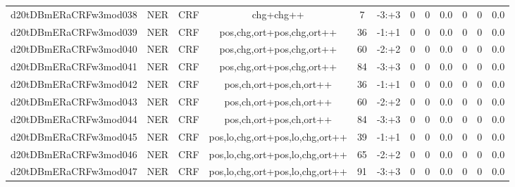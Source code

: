 \documentclass[a4paper]{article}
\begin{document}
\begin{landscape}
\begin{center}
\begin{tabular}{ |c|c|c|c|c|c|c|c|c|c|c|c|}
 
 	
 	\small{ d20tDBmERaCRFw3mod038 } & \small{ NER} & \small{  CRF }  & chg+chg++  &  7 &  \small{  -3:+3 }  &  0 & 0 & 0.0  &  0 & 0 & 0.0 \\
 	

 
 	
 	\small{ d20tDBmERaCRFw3mod039 } & \small{ NER} & \small{  CRF }  & pos,chg,ort+pos,chg,ort++  &  36 &  \small{  -1:+1 }  &  0 & 0 & 0.0  &  0 & 0 & 0.0 \\
 	

 
 	
 	\small{ d20tDBmERaCRFw3mod040 } & \small{ NER} & \small{  CRF }  & pos,chg,ort+pos,chg,ort++  &  60 &  \small{  -2:+2 }  &  0 & 0 & 0.0  &  0 & 0 & 0.0 \\
 	

 
 	
 	\small{ d20tDBmERaCRFw3mod041 } & \small{ NER} & \small{  CRF }  & pos,chg,ort+pos,chg,ort++  &  84 &  \small{  -3:+3 }  &  0 & 0 & 0.0  &  0 & 0 & 0.0 \\
 	

 
 	
 	\small{ d20tDBmERaCRFw3mod042 } & \small{ NER} & \small{  CRF }  & pos,ch,ort+pos,ch,ort++  &  36 &  \small{  -1:+1 }  &  0 & 0 & 0.0  &  0 & 0 & 0.0 \\
 	

 
 	
 	\small{ d20tDBmERaCRFw3mod043 } & \small{ NER} & \small{  CRF }  & pos,ch,ort+pos,ch,ort++  &  60 &  \small{  -2:+2 }  &  0 & 0 & 0.0  &  0 & 0 & 0.0 \\
 	

 
 	
 	\small{ d20tDBmERaCRFw3mod044 } & \small{ NER} & \small{  CRF }  & pos,ch,ort+pos,ch,ort++  &  84 &  \small{  -3:+3 }  &  0 & 0 & 0.0  &  0 & 0 & 0.0 \\
 	

 
 	
 	\small{ d20tDBmERaCRFw3mod045 } & \small{ NER} & \small{  CRF }  & pos,lo,chg,ort+pos,lo,chg,ort++  &  39 &  \small{  -1:+1 }  &  0 & 0 & 0.0  &  0 & 0 & 0.0 \\
 	

 
 	
 	\small{ d20tDBmERaCRFw3mod046 } & \small{ NER} & \small{  CRF }  & pos,lo,chg,ort+pos,lo,chg,ort++  &  65 &  \small{  -2:+2 }  &  0 & 0 & 0.0  &  0 & 0 & 0.0 \\
 	

 
 	
 	\small{ d20tDBmERaCRFw3mod047 } & \small{ NER} & \small{  CRF }  & pos,lo,chg,ort+pos,lo,chg,ort++  &  91 &  \small{  -3:+3 }  &  0 & 0 & 0.0  &  0 & 0 & 0.0 \\
 	


\end{tabular}
\end{center}
\end{landscape}
\end{document}
